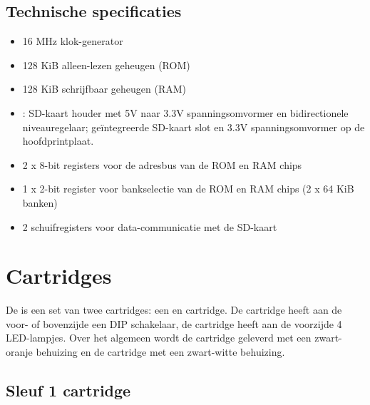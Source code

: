 %
%
\subsection{Technische specificaties}

\begin{itemize}[noitemsep]
    \item 16 MHz klok-generator
    \item 128 KiB alleen-lezen geheugen (ROM)
    \item 128 KiB schrijfbaar geheugen (RAM)
    \item \faLocationArrow{}: SD-kaart houder met 5V naar 3.3V spanningsomvormer en bidirectionele niveauregelaar; \faLocationArrow{} geïntegreerde SD-kaart slot en 3.3V spanningsomvormer op de hoofdprintplaat.
    \item 2 x 8-bit registers voor de adresbus van de ROM en RAM chips
    \item 1 x 2-bit register voor bankselectie van de ROM en RAM chips (2 x 64 KiB banken)
    \item 2 schuifregisters voor data-communicatie met de SD-kaart
\end{itemize}

%
%
%
\section{Cartridges}

De \product is een set van twee cartridges: een  en  cartridge. De  cartridge heeft aan de voor- of bovenzijde een DIP schakelaar, de  cartridge heeft aan de voorzijde 4 LED-lampjes. Over het algemeen wordt de  cartridge geleverd met een zwart-oranje behuizing en de  cartridge met een zwart-witte behuizing.


%
%
%
\subsection{Sleuf 1 cartridge}

